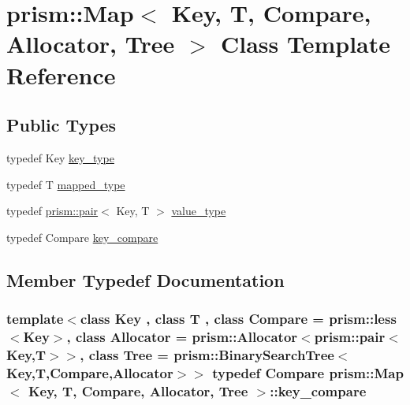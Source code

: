 \hypertarget{classprism_1_1_map}{}\section{prism\+:\+:Map$<$ Key, T, Compare, Allocator, Tree $>$ Class Template Reference}
\label{classprism_1_1_map}
\subsection*{Public Types}
\begin{DoxyCompactItemize}
\item 
typedef Key \hyperlink{classprism_1_1_map_a6283cb3456c68eb923bc85da29145726}{key\+\_\+type}
\item 
typedef T \hyperlink{classprism_1_1_map_a4df78b98ece716ef83ea96312cb8f144}{mapped\+\_\+type}
\item 
typedef \hyperlink{structprism_1_1pair}{prism\+::pair}$<$ Key, T $>$ \hyperlink{classprism_1_1_map_a21b00d887e1302d00061354c35c54f89}{value\+\_\+type}
\item 
typedef Compare \hyperlink{classprism_1_1_map_a69d0f3cbfe64a7f586e53f5997323151}{key\+\_\+compare}
\end{DoxyCompactItemize}


\subsection{Member Typedef Documentation}
\subsubsection[{\texorpdfstring{key\+\_\+compare}{key_compare}}]{\setlength{\rightskip}{0pt plus 5cm}template$<$class Key , class T , class Compare  = prism\+::less$<$\+Key$>$, class Allocator  = prism\+::\+Allocator$<$prism\+::pair$<$\+Key,\+T$>$$>$, class Tree  = prism\+::\+Binary\+Search\+Tree$<$\+Key,\+T,\+Compare,\+Allocator$>$$>$ typedef Compare {\bf prism\+::\+Map}$<$ Key, T, Compare, {\bf Allocator}, Tree $>$\+::{\bf key\+\_\+compare}}\hypertarget{classprism_1_1_map_a69d0f3cbfe64a7f586e53f5997323151}{}\label{classprism_1_1_map_a69d0f3cbfe64a7f586e53f5997323151}
